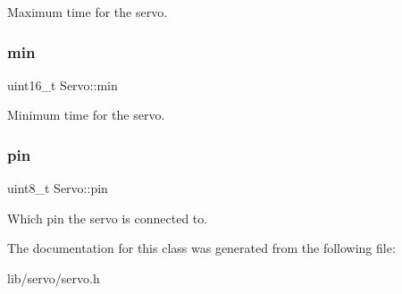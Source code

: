 Maximum time for the servo. \hypertarget{class_servo_ad04fdb646ea971c3a1395d92a64a2a1a}{}\label{class_servo_ad04fdb646ea971c3a1395d92a64a2a1a} 
\subsubsection{\texorpdfstring{min}{min}}
{\footnotesize\ttfamily uint16\+\_\+t Servo\+::min\hspace{0.3cm}{\ttfamily [private]}}

Minimum time for the servo. \hypertarget{class_servo_a11962573ddd272b426724e62c250990e}{}\label{class_servo_a11962573ddd272b426724e62c250990e} 
\subsubsection{\texorpdfstring{pin}{pin}}
{\footnotesize\ttfamily uint8\+\_\+t Servo\+::pin\hspace{0.3cm}{\ttfamily [private]}}

Which pin the servo is connected to. 

The documentation for this class was generated from the following file\+:\begin{DoxyCompactItemize}
\item 
lib/servo/servo.\+h\end{DoxyCompactItemize}
